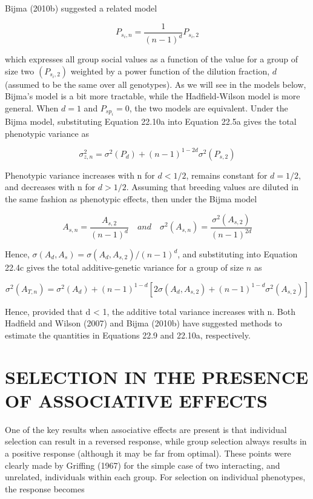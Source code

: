 \documentclass{article}
\begin{document}
Bijma (2010b) suggested a related model

\begin{equation}
P_{s_{i},n}=\frac{1}{(n-1)^{d}}P_{s_{i},2}
\tag{22.10a}
\label{eq:22_10a}
\end{equation}

which expresses all group social values as a function of the value for a group of size two  $ (P_{s_i,2}) $ weighted by a power function of the dilution fraction,  $ d $ (assumed to be the same over all genotypes). As we will see in the models below, Bijma's model is a bit more tractable, while the Hadfield-Wilson model is more general. When  $ d = 1 $ and  $ P_{sp_i} = 0 $, the two models are equivalent. Under the Bijma model, substituting Equation 22.10a into Equation 22.5a gives the total phenotypic variance as

\begin{equation}
\sigma_{z,n}^{2}=\sigma^{2}(P_{d})+(n-1)^{1-2d}\sigma^{2}(P_{s,2})
\tag{22.10b}
\label{eq:22_10b}
\end{equation}

Phenotypic variance increases with n for  $ d < 1/2 $, remains constant for  $ d = 1/2 $, and decreases with n for  $ d > 1/2 $. Assuming that breeding values are diluted in the same fashion as phenotypic effects, then under the Bijma model

\begin{equation}
A_{s,n}=\frac{A_{s,2}}{(n-1)^{d}}\quad and\quad\sigma^{2}(A_{s,n})=\frac{\sigma^{2}(A_{s,2})}{(n-1)^{2d}}
\tag{22.10c}
\label{eq:22_10c}
\end{equation}

Hence,  $ \sigma(A_d, A_s) = \sigma(A_d, A_{s,2})/(n-1)^d $, and substituting into Equation 22.4c gives the total additive-genetic variance for a group of size  $ n $ as

\begin{equation}
\sigma^{2}(A_{T,n})=\sigma^{2}(A_{d})+(n-1)^{1-d}\left[2\sigma(A_{d},A_{s,2})+(n-1)^{1-d}\sigma^{2}(A_{s,2})\right]
\tag{22.10d}
\label{eq:22_10d}
\end{equation}

Hence, provided that d < 1, the additive total variance increases with n. Both Hadfield and Wilson (2007) and Bijma (2010b) have suggested methods to estimate the quantities in Equations 22.9 and 22.10a, respectively.

\section{SELECTION IN THE PRESENCE OF ASSOCIATIVE EFFECTS}
One of the key results when associative effects are present is that individual selection can result in a reversed response, while group selection always results in a positive response (although it may be far from optimal). These points were clearly made by Griffing (1967) for the simple case of two interacting, and unrelated, individuals within each group. For selection on individual phenotypes, the response becomes
\end{document}
